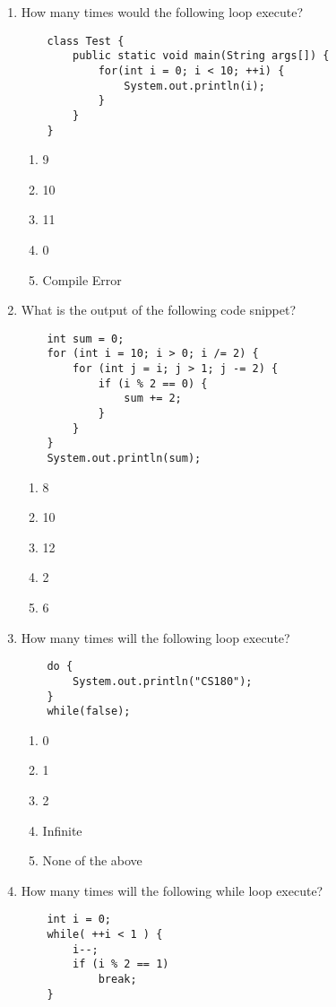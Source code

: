 \documentclass[S17-Final.tex]{subfiles}
\begin{document}
\begin{enumerate}
\item How many times would the following loop execute?
\begin{lstlisting}
    class Test {
        public static void main(String args[]) {
            for(int i = 0; i < 10; ++i) {
                System.out.println(i);
            }
        }
    }
\end{lstlisting}
	
\begin{enumerate}
\item  9
\item  10 \ifdraft \Ans \fi 
\item  11
\item  0
\item  Compile Error
\end{enumerate}

\item What is the output of the following code snippet?
\begin{lstlisting}
    int sum = 0;
    for (int i = 10; i > 0; i /= 2) {
        for (int j = i; j > 1; j -= 2) {
            if (i % 2 == 0) {
                sum += 2;
            }
        }
    }
    System.out.println(sum);
\end{lstlisting}
	
\begin{enumerate}
\item  8
\item  10
\item  12 \ifdraft \Ans \fi 
\item  2
\item  6
\end{enumerate}

\item How many times will the following loop execute?
\begin{lstlisting}
    do {
	    System.out.println("CS180");
    }
    while(false);
\end{lstlisting}
	
\begin{enumerate}
\item  0
\item  1 \ifdraft \Ans \fi 
\item  2
\item  Infinite
\item  None of the above
\end{enumerate}

\item How many times will the following while loop execute?
\begin{lstlisting}
    int i = 0;
    while( ++i < 1 ) {
        i--;
        if (i % 2 == 1)
            break;
    }
\end{lstlisting}
	

\end{enumerate}
\end{document}
